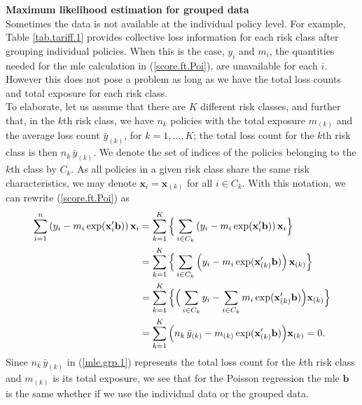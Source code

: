 \documentclass[12pt]{article}
\begin{document}
\noindent\textbf{Maximum likelihood estimation for grouped data\\}
Sometimes the data is not available at the individual policy level. For example, Table \ref{tab.tariff.1} provides collective loss information for each risk class after grouping individual policies. When this is the case, $y_i$ and $m_i$, the quantities needed for the mle calculation in (\ref{score.ft.Poi}), are unavailable for each $i$. However this does not pose a problem as long as we have the total loss counts and total exposure for each risk class. \\

To elaborate, let us assume that there are $K$ different risk classes, and further that, in the $k$th risk class, we have $n_k$ policies with the total exposure $m_{(k)}$ and the average loss count $\bar{y}_{(k)}$, for $k=1, \ldots, K$;  the total loss count for the $k$th risk class is then $n_k\, \bar{y}_{(k)}$. We denote the set of indices of the policies belonging to the $k$th class by $C_k$. As all policies in a given risk class share the same risk characteristics, we may denote 
$\mathbf{ x}_i=\mathbf{ x}_{(k)}$ for all $i \in C_k$. With this notation, we can rewrite  (\ref{score.ft.Poi}) as
\begin{align}
\nonumber \sum^n_{i=1} \left(y_i -m_i \exp(\mathbf{ x}^{\prime}_i \mathbf{ b}) \right)\mathbf{ x}_i &= \sum^K_{k=1}\Big{\{}\sum_{i \in C_k} \left(y_i -m_i \exp(\mathbf{ x}^{\prime}_i \mathbf{ b}) \right)\mathbf{ x}_i  \Big{\}} \\
\nonumber     &  =\sum^K_{k=1}\Big{\{} \sum_{i \in C_k} \left(y_i -m_i \exp(\mathbf{ x}^{\prime}_{(k)} \mathbf{ b}) \right)\mathbf{ x}_{(k)}  \Big{\}} \\
\nonumber     &  =\sum^K_{k=1}\Big{\{}  \Big(\sum_{i \in C_k}y_i -\sum_{i \in C_k}m_i \exp(\mathbf{ x}^{\prime}_{(k)} \mathbf{ b}) \Big)\mathbf{ x}_{(k)}  \Big{\}} \\
\label{mle.grp.1}      &  =\sum^K_{k=1} \Big(n_k\, \bar{y}_{(k)}-m_{(k)} \exp(\mathbf{ x}^{\prime}_{(k)} \mathbf{ b}) \Big)\mathbf{ x}_{(k)} =0.
\end{align}
Since $n_k\, \bar{y}_{(k)}$ in (\ref{mle.grp.1}) represents the total loss count for the $k$th risk class and  $m_{(k)}$ is its total exposure,  we see that for the Poisson regression the mle $\mathbf{ b}$ is the same whether if we use the individual data or the grouped data.\\
\end{document}
